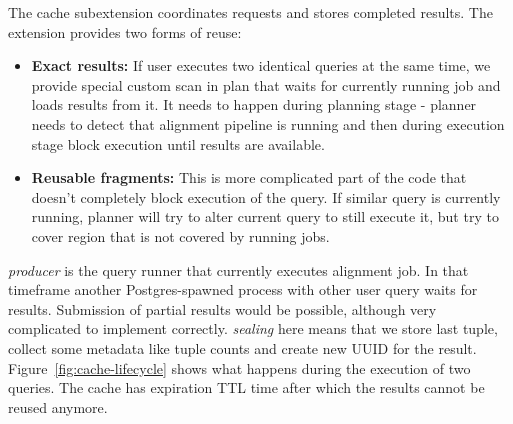The cache subextension coordinates requests and stores completed results.
The extension provides two forms of reuse:
\begin{itemize}
  \item \textbf{Exact results:} If user executes two identical queries at the same time, we provide special custom scan in plan that waits for currently running job and loads results from it. It needs to happen during planning stage - planner needs to detect that alignment pipeline is running 
  and then during execution stage block execution until results are available.
  \item \textbf{Reusable fragments:} This is more complicated part of the code that doesn't completely block execution of the query. If similar query is currently running, planner will try to alter current query to still execute it, but try to cover region that is not covered by running jobs.
\end{itemize}

\emph{producer} is the query runner that currently executes alignment job. 
In that timeframe another Postgres-spawned process with other user query waits for results.
Submission of partial results would be possible, although very complicated to implement correctly.
\emph{sealing} here means that we store last tuple, collect some metadata like tuple counts and create new UUID for the result.
Figure~\ref{fig:cache-lifecycle} shows what happens during the execution of two queries. 
The cache has expiration TTL time after which the results cannot be reused anymore.


